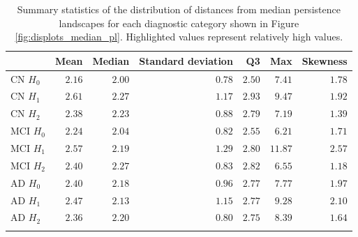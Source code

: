 \documentclass{article}
\begin{document}
\begin{table}
\centering
\begin{tabular}{lrrrrrr}
  \toprule {} & Mean & Median & Standard deviation & Q3 & Max & Skewness \\
  \midrule CN $H_0$ & $2.16$ & $2.00$ & $0.78$ & $2.50$ & $7.41$ & $1.78$ \\
  CN $H_1$ & $2.61$ & $2.27$ & $1.17$ & $2.93$ & $9.47$ & $1.92$ \\
  CN $H_2$ & $2.38$ & $2.23$ & $0.88$ & $2.79$ & $7.19$ & $1.39$ \\
  MCI $H_0$ & $2.24$ & $2.04$ & $0.82$ & $2.55$ & $6.21$ & $1.71$ \\
  MCI $H_1$ & $2.57$ & $2.19$ & $1.29$ & $2.80$ & $\mathbf{11.87}$ & $\mathbf{2.57}$ \\
  MCI $H_2$ & $2.40$ & $2.27$ & $0.83$ & $2.82$ & $6.55$ & $1.18$ \\
  AD $H_0$ & $2.40$ & $2.18$ & $0.96$ & $2.77$ & $7.77$ & $1.97$ \\
  AD $H_1$ & $2.47$ & $2.13$ & $1.15$ & $2.77$ & $\mathbf{9.28}$ & $\mathbf{2.10}$ \\
  AD $H_2$ & $2.36$ & $2.20$ & $0.80$ & $2.75$ & $8.39$ & $1.64$ \\
  \bottomrule
  \vspace{1pt}
\end{tabular}
\caption{Summary statistics of the distribution of distances from median persistence landscapes for
each diagnostic category shown in Figure \ref{fig:displots_median_pl}. Highlighted values represent
relatively high values.}
\label{tab:stats_median_pl}
\end{table}
\end{document}
